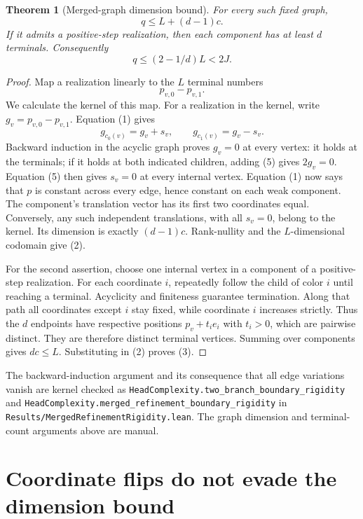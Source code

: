\documentclass[11pt]{article}
\newtheorem{theorem}{Theorem}
\begin{document}
\begin{theorem}[Merged-graph dimension bound]
For every such fixed graph,
\[
                         q\le L+(d-1)c.
 \tag{2}
\]
If it admits a positive-step realization, then each component has at
least $d$ terminals. Consequently
\[
                     q\le(2-1/d)L<2J.
 \tag{3}
\]
\end{theorem}
\begin{proof}
Map a realization linearly to the $L$ terminal numbers
\[
                       p_{v,0}-p_{v,1}.
 \tag{4}
\]
We calculate the kernel of this map. For a realization in the kernel,
write $g_v=p_{v,0}-p_{v,1}$. Equation (1) gives
\[
                    g_{c_0(v)}=g_v+s_v,\qquad
                    g_{c_1(v)}=g_v-s_v.
 \tag{5}
\]
Backward induction in the acyclic graph proves $g_v=0$ at every
vertex: it holds at the terminals; if it holds at both indicated
children, adding (5) gives $2g_v=0$. Equation (5) then gives
$s_v=0$ at every internal vertex. Equation (1) now says that $p$
is constant across every edge, hence constant on each weak component.
The component's translation vector has its first two coordinates equal.
Conversely, any such independent translations, with all $s_v=0$,
belong to the kernel. Its dimension is exactly $(d-1)c$.
Rank-nullity and the $L$-dimensional codomain give (2).

For the second assertion, choose one internal vertex in a component
of a positive-step realization. For each coordinate $i$, repeatedly
follow the child of color $i$ until reaching a terminal. Acyclicity
and finiteness guarantee termination. Along that path all coordinates
except $i$ stay fixed, while coordinate $i$ increases strictly.
Thus the $d$ endpoints have respective positions $p_v+t_i e_i$
with $t_i>0$, which are pairwise distinct. They are therefore distinct
terminal vertices. Summing over components gives $dc\le L$.
Substituting in (2) proves (3).
\end{proof}

The backward-induction argument and its consequence that all edge
variations vanish are kernel checked as
\texttt{HeadComplexity.two\_branch\_boundary\_rigidity} and
\texttt{HeadComplexity.merged\_refinement\_boundary\_rigidity}
in \texttt{Results/MergedRefinementRigidity.lean}. The graph dimension
and terminal-count arguments above are manual.

\section{Coordinate flips do not evade the dimension bound}
\end{document}
